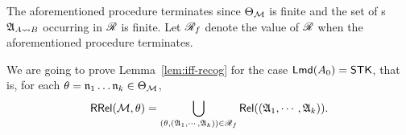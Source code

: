 \medskip

The aforementioned procedure terminates since $\Theta_{\mathcal{M} }$ is finite and the set of {\NFA}s ${\mathfrak{A} }_{A\rightsquigarrow B}$ occurring in $\mathscr{R}$ is finite.
Let $\mathscr{R}_f$ denote the value of $\mathscr{R}$ when the aforementioned procedure terminates. 










We are going to prove Lemma~\ref{lem:iff-recog} for the case ${\sf Lmd}(A_0) = {\sf STK}$, that is, for each $\theta=\mathfrak{n}_1\dots\mathfrak{n}_k\in\Theta_{{\mathcal{M} }}$, 
%
\[\mathsf{RRel}({\mathcal{M} }, \theta) = \bigcup \limits_{(\theta, ({\mathfrak{A} }_1, \cdots, {\mathfrak{A} }_k)) \in \mathscr{R}_f} \mathsf{Rel}(({\mathfrak{A} }_1, \cdots, {\mathfrak{A} }_k)).\]

